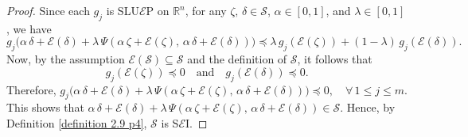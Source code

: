 \documentclass[12pt, reqno]{amsart}
\theoremstyle{definition}
\theoremstyle{remark}
\numberwithin{equation}{section}
\begin{document}
\begin{proof}
Since each $g_j$ is SLU$\mathcal{E}$P on $\mathbb{R}^{n}$, for any $\zeta,\, \delta \in \mathcal{S}$, $\alpha \in [0,1]$, and $\lambda \in [0,1]$, we have
\[
g_j\!\big(\alpha\, \delta + \mathcal{E}(\delta) + \lambda\, \Psi(\alpha\, \zeta + \mathcal{E}(\zeta),\, \alpha\, \delta + \mathcal{E}(\delta))\big)
\preceq
\lambda\, g_j(\mathcal{E}(\zeta)) + (1 - \lambda)\, g_j(\mathcal{E}(\delta)).
\]
Now, by the assumption $\mathcal{E}(\mathcal{S}) \subseteq \mathcal{S}$ and the definition of $\mathcal{S}$, it follows that
\[
g_j(\mathcal{E}(\zeta)) \preceq 0 \quad \text{and} \quad g_j(\mathcal{E}(\delta)) \preceq 0.
\]
Therefore, $g_j\!\big(\alpha\, \delta + \mathcal{E}(\delta) + \lambda\, \Psi(\alpha\, \zeta + \mathcal{E}(\zeta),\, \alpha\, \delta + \mathcal{E}(\delta))\big) \preceq 0,
\quad \forall\, 1 \leq j \leq m.$
This shows that
$
\alpha\, \delta + \mathcal{E}(\delta) + \lambda\, \Psi(\alpha\, \zeta + \mathcal{E}(\zeta),\, \alpha\, \delta + \mathcal{E}(\delta)) \in \mathcal{S}.
$
Hence, by Definition \ref{definition 2.9 p4}, $\mathcal{S}$ is S$\mathcal{E}$I.
\end{proof}

\noindent


\end{document}
